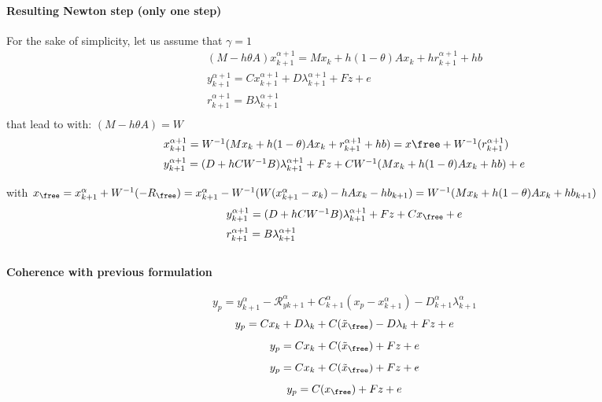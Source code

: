 \paragraph{Resulting Newton step (only one step)}
For the sake of simplicity, let us assume that $\gamma =1$
\begin{equation}
  \begin{array}{l}
     (M -h\theta A)x^{\alpha+1}_{k+1} = M x_{k} +h(1-\theta) A x_k + hr^{\alpha+1}_{k+1} + hb\\[2mm]
     y^{\alpha+1}_{k+1} =  C x^{\alpha+1}_{k+1} + D \lambda ^{\alpha+1}_{k+1} +Fz + e \\[2mm]
     r^{\alpha+1}_{k+1} = B \lambda ^{\alpha+1}_{k+1}\\[2mm]
  \end{array}
\end{equation}
that lead to with: $ (M -h\theta A) = W$
\begin{equation}
  \begin{array}{l}
     x^{\alpha+1}_{k+1} = W^{-1}(M x_{k} +h(1-\theta) A x_k + r^{\alpha+1}_{k+1} +hb) = x\free + W^{-1}(r^{\alpha+1}_{k+1})\\[2mm]
     y^{\alpha+1}_{k+1} =  ( D+hCW^{-1}B) \lambda ^{\alpha+1}_{k+1} +Fz + CW^{-1}(M
     x_k+h(1-\theta)Ax_k + hb) +e \\[2mm]
  \end{array}
\end{equation}
with $x_{\free} = x^{\alpha}_{k+1} + W^{-1}(-R_{\free})= x^{\alpha}_{k+1} - W^{-1}(W(x^{\alpha}_{k+1}
- x_k) -hAx_k-hb_{k+1} )= W^{-1}(Mx_k +h(1-\theta)Ax_k +h b_{k+1})$
\begin{equation}
  \begin{array}{l}
     y^{\alpha+1}_{k+1} =  ( D+hCW^{-1}B) \lambda ^{\alpha+1}_{k+1} +Fz + Cx_{\free}+e\\[2mm]
     r^{\alpha+1}_{k+1} = B \lambda ^{\alpha+1}_{k+1}\\[2mm]
  \end{array}
\end{equation}

\paragraph{Coherence with previous formulation}
\[y_p = y^{\alpha}_{k+1} -\mathcal R^{\alpha}_{yk+1} + C^{\alpha}_{k+1}(x_p -x^{\alpha}_{k+1}) -
D^{\alpha}_{k+1} \lambda^{\alpha}_{k+1} \]
\[y_p = Cx_k + D \lambda _k  + C(\tilde x_{\free}) -D \lambda_k +Fz + e\]
\[y_p = Cx_k   + C(\tilde x_{\free})  +Fz + e\]
\[y_p = Cx_k   + C(\tilde x_{\free})  +Fz + e\]
\[y_p = C(x_{\free})  +Fz + e\]

\clearpage


